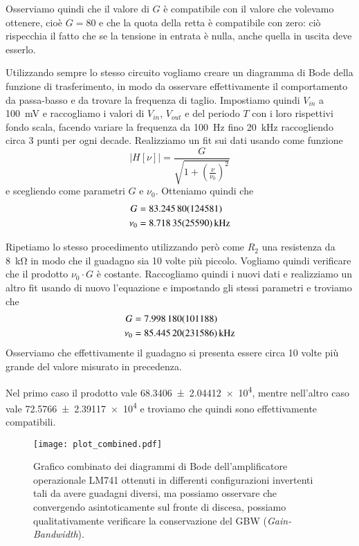 \documentclass[
    rmp,
    reprint, 
    superscriptaddress, 
    altaffilletter, 
    amsmath, 
    amssymb,
    a4paper]{revtex4-2}
\begin{document}
Osserviamo quindi che il valore di $G$ è compatibile con il valore che volevamo ottenere, cioè $G=80$ e che la quota della retta è compatibile con zero: ciò rispecchia il fatto che se la tensione in entrata è nulla, anche quella in uscita deve esserlo.

Utilizzando sempre lo stesso circuito vogliamo creare un diagramma di Bode della funzione di trasferimento, in modo da osservare effettivamente il comportamento da passa-basso e da trovare la frequenza di taglio. Impostiamo quindi $V_{in}$ a \SI{100}{\milli\volt} e raccogliamo i valori di $V_{in}$, $V_{out}$ e del periodo $T$ con i loro rispettivi fondo scala, facendo variare la frequenza da \SI{100}{\hertz} fino \SI{20}{\kilo\hertz} raccogliendo circa 3 punti per ogni decade. Realizziamo un fit sui dati usando come funzione  \begin{equation}\left|H[\nu]\right|=\frac{G}{\sqrt{1+\left(\frac{\nu}{\nu_0}\right)^2}} \label{eq:H}\end{equation} e scegliendo come parametri $G$ e $\nu_0$. 
Otteniamo quindi che
\begin{align*}
    G     &=\num{ 83.2458 +- 1.24581} \\
    \nu_0 &=\SI{8.71835 +- 0.2559}{\kilo\hertz} \\ 
\end{align*}

Ripetiamo lo stesso procedimento utilizzando però come $R_2$ una resistenza da \SI{8}{\kilo\ohm} in modo che il guadagno sia 10 volte più piccolo. Vogliamo quindi verificare che il prodotto $\nu_0 \cdot G $ è costante. Raccogliamo quindi i nuovi dati e realizziamo un altro fit usando di nuovo l'equazione  e impostando gli stessi parametri e troviamo che
\begin{align*}
    G     &=\num{7.99818 +- 0.101188} \\
    \nu_0 &=\SI{85.4452 +- 2.31586}{\kilo\hertz} \\ 
\end{align*}
Osserviamo che effettivamente il guadagno si presenta essere circa 10 volte più grande del valore misurato in precedenza.

Nel primo caso il prodotto vale \num{68.3406 +- 2.04412e4}, mentre nell'altro caso vale \num{72.5766 +- 2.39117e4} e troviamo che quindi sono effettivamente compatibili.

\begin{figure}
    \texttt{[image: plot\_combined.pdf]}
    \caption{Grafico combinato dei diagrammi di Bode dell'amplificatore operazionale LM741 ottenuti in differenti configurazioni invertenti tali da avere guadagni diversi, ma possiamo osservare che convergendo asintoticamente sul fronte di discesa, possiamo qualitativamente verificare la conservazione del GBW (\emph{Gain-Bandwidth}).}
    \label{fig:plot_combined}
\end{figure}
\end{document}
